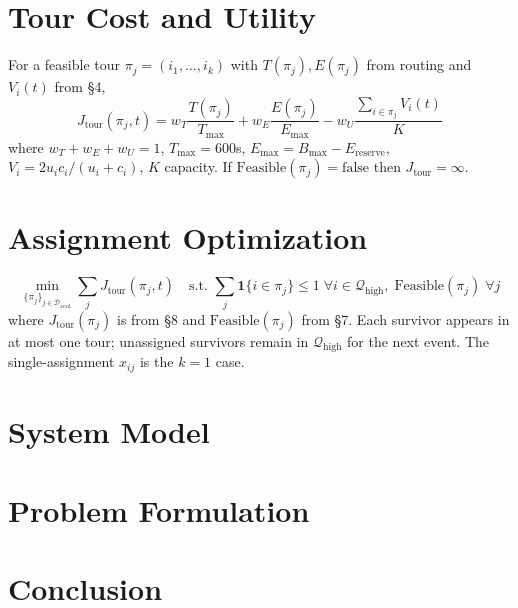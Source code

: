 \documentclass[conference]{IEEEtran}
\begin{document}
\section{Tour Cost and Utility}
For a feasible tour $\pi_j=(i_1,\dots,i_k)$ with $T(\pi_j),E(\pi_j)$ from routing and $V_i(t)$ from \S4,
\begin{equation}
J_{\text{tour}}(\pi_j,t)=w_T\frac{T(\pi_j)}{T_{\max}}+w_E\frac{E(\pi_j)}{E_{\max}}-w_U\frac{\sum_{i\in\pi_j}V_i(t)}{K}
\end{equation}
where $w_T+w_E+w_U=1$, $T_{\max}=600$s, $E_{\max}=B_{\max}-E_{\text{reserve}}$, $V_i=2u_ic_i/(u_i+c_i)$, $K$ capacity. If $\text{Feasible}(\pi_j)=\text{false}$ then $J_{\text{tour}}=\infty$.

\section{Assignment Optimization}
\begin{equation}
\min_{\{\pi_j\}_{j\in\mathcal{D}_{\text{avail}}}} \sum_{j} J_{\text{tour}}(\pi_j,t) \quad \text{s.t. } \sum_{j}\mathbf{1}\{i\in\pi_j\}\leq1\;\forall i\in\mathcal{Q}_{\text{high}},\; \text{Feasible}(\pi_j)\;\forall j
\end{equation}
where $J_{\text{tour}}(\pi_j)$ is from \S8 and $\text{Feasible}(\pi_j)$ from \S7. Each survivor appears in at most one tour; unassigned survivors remain in $\mathcal{Q}_{\text{high}}$ for the next event. The single-assignment $x_{ij}$ is the $k=1$ case.

\section{System Model}

\section{Problem Formulation}

\section{Conclusion}
\end{document}
